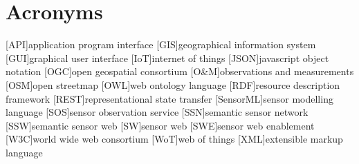 
\chapter*{Acronyms}

\begin{acronym}[UML]
  [API]{application program interface}
  [GIS]{geographical information system}
  [GUI]{graphical user interface}
  [IoT]{internet of things}
  [JSON]{javascript object notation}
  [OGC]{open geospatial consortium}
  [O\&M]{observations and measurements}
  [OSM]{open streetmap}
  [OWL]{web ontology language}
  [RDF]{resource description framework}
  [REST]{representational state transfer}
  [SensorML]{sensor modelling language}
  [SOS]{sensor observation service}
  [SSN]{semantic sensor network}
  [SSW]{semantic sensor web}
  [SW]{sensor web}
  [SWE]{sensor web enablement}
  [W3C]{world wide web consortium}
  [WoT]{web of things}
  [XML]{extensible markup language}
\end{acronym}